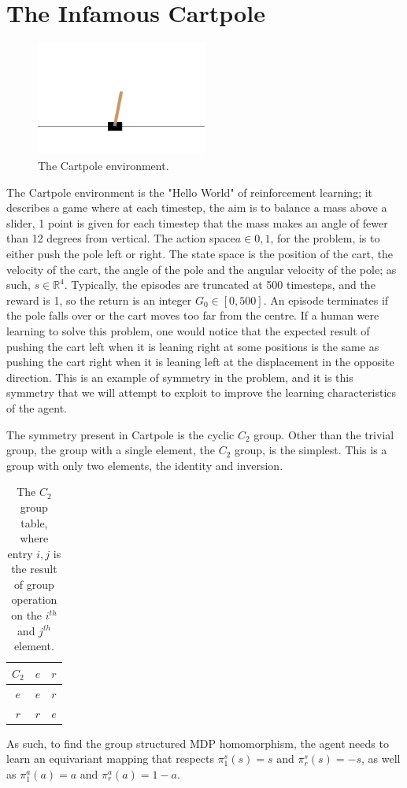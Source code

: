 \section{The Infamous Cartpole}
\begin{figure}[h!]
	\centering
	\includegraphics[width=0.5\textwidth]{Figures/cart_pole.png}
	\caption{The Cartpole environment.}
\end{figure}
The Cartpole environment is the "Hello World" of reinforcement learning; it describes a game where at each timestep, the aim is to balance a mass above a slider, 1 point is given for each timestep that the mass makes an angle of fewer than 12 degrees from vertical. The action space$a \in {0,1}$, for the problem, is to either push the pole left or right. The state space is the position of the cart, the velocity of the cart, the angle of the pole and the angular velocity of the pole; as such, $s \in \mathbb{R}^4$. Typically, the episodes are truncated at 500 timesteps, and the reward is 1, so the return is an integer $G_0 \in [0, 500]$. An episode terminates if the pole falls over or the cart moves too far from the centre. If a human were learning to solve this problem, one would notice that the expected result of pushing the cart left when it is leaning right at some positions is the same as pushing the cart right when it is leaning left at the displacement in the opposite direction. This is an example of symmetry in the problem, and it is this symmetry that we will attempt to exploit to improve the learning characteristics of the agent.

The symmetry present in Cartpole is the cyclic $C_2$ group. Other than the trivial group, the group with a single element, the $C_2$ group, is the simplest. This is a group with only two elements, the identity and inversion.
\begin{table}[h!]
	\centering
	\begin{tabular}{c | c  c}
		$C_2$ & $e$ & $r$ \\
		\hline
		$e$   & $e$ & $r$ \\
		$r$   & $r$ & $e$
	\end{tabular}
	\caption{The $C_2$ group table, where entry $i, j$ is the result of group operation on the $i^{th}$ and $j^{th}$ element.}
\end{table}


As such, to find the group structured MDP homomorphism, the agent needs to learn an equivariant mapping that respects $\pi_1^s(s) = s$ and $\pi_r^s(s) = -s$, as well as $\pi_1^a(a) = a$ and $\pi_r^a(a) = 1 - a$.

